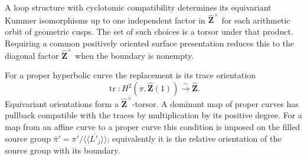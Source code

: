 \begin{proposition}
\label{A:kummer-ambiguity}
A loop structure with cyclotomic compatibility determines
its equivariant Kummer isomorphisms up to one independent
factor in $\widehat{\mathbf Z}^{\times}$ for each
arithmetic orbit of geometric cusps.  The set of such
choices is a torsor under that product.  Requiring a
common positively oriented surface presentation reduces
this to the diagonal factor
$\widehat{\mathbf Z}^{\times}$ when the boundary is
nonempty.

For a proper hyperbolic curve the replacement is its
trace orientation
\[
 \operatorname{tr}:H^2(\pi,\widehat{\mathbf Z}(1))
                       \xrightarrow{\sim}\widehat{\mathbf Z}.
\]
Equivariant orientations form a
$\widehat{\mathbf Z}^{\times}$-torsor.  A dominant
map of proper curves has pullback compatible with the
traces by multiplication by its positive degree.
For a map from an affine curve to a proper curve this
condition is imposed on the filled source group
$\bar\pi'=\pi'/\overline{\langle\!\langle L'_j
\rangle\!\rangle}$; equivalently it is the relative
orientation of the source group with its boundary.
\end{proposition}
